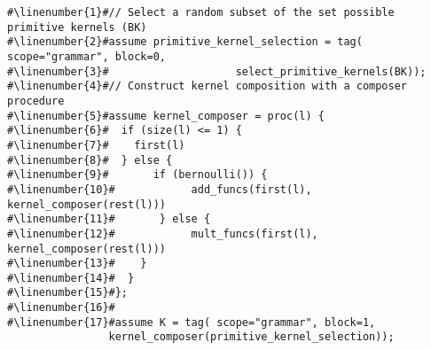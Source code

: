 \begin{mdframed}
\begin{minipage}{\linewidth}
\small
\belowcaptionskip=-10pt
\begin{lstlisting}[mathescape,label=alg:grammar,basicstyle=\selectfont\ttfamily,numbers=none,caption={
Stochastic Grammar},escapechar=\#]
#\linenumber{1}#// Select a random subset of the set possible primitive kernels (BK)
#\linenumber{2}#assume primitive_kernel_selection = tag( scope="grammar", block=0,
#\linenumber{3}#					select_primitive_kernels(BK));
#\linenumber{4}#// Construct kernel composition with a composer procedure
#\linenumber{5}#assume kernel_composer = proc(l) {
#\linenumber{6}#  if (size(l) <= 1) {
#\linenumber{7}#    first(l)
#\linenumber{8}#  } else {
#\linenumber{9}#       if (bernoulli()) {
#\linenumber{10}#            add_funcs(first(l),  kernel_composer(rest(l)))
#\linenumber{11}#       } else {
#\linenumber{12}#            mult_funcs(first(l), kernel_composer(rest(l)))
#\linenumber{13}#    }
#\linenumber{14}#  }
#\linenumber{15}#};
#\linenumber{16}#
#\linenumber{17}#assume K = tag( scope="grammar", block=1,
	        	kernel_composer(primitive_kernel_selection));
\end{lstlisting}

\end{minipage}
\end{mdframed}
